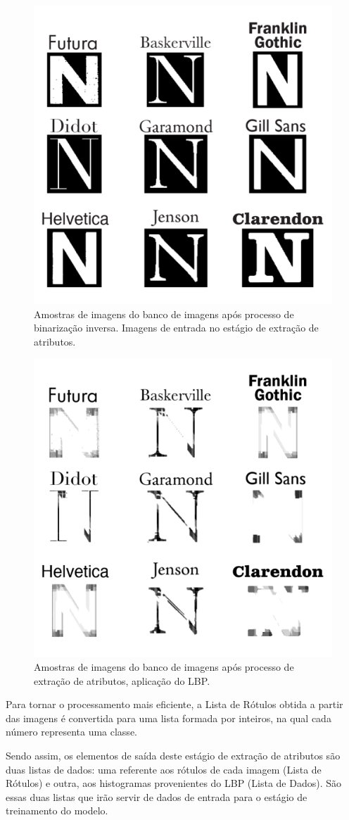 \begin{figure}[H]
  \centering
  \includegraphics[width=0.4\linewidth]{figuras/nbinario.pdf}
  \caption{Amostras de imagens do banco de imagens após processo de binarização inversa. Imagens de entrada no estágio de extração de atributos.}
  \label{fig:nbinario}
\end{figure}


\begin{figure}[H]
  \centering
  \includegraphics[width=0.4\linewidth]{figuras/enelbp.pdf}
  \caption{Amostras de imagens do banco de imagens após processo de extração de atributos, aplicação do LBP.}
  \label{fig:nlbp}
\end{figure}

Para tornar o processamento mais eficiente, a Lista de Rótulos obtida a partir das imagens é convertida para uma lista formada por inteiros, na qual cada número representa uma classe.

Sendo assim, os elementos de saída deste estágio de extração de atributos são duas listas de dados: uma referente aos rótulos de cada imagem (Lista de Rótulos) e outra, aos histogramas provenientes do LBP (Lista de Dados). São essas duas listas que irão servir de dados de entrada para o estágio de treinamento do modelo.


